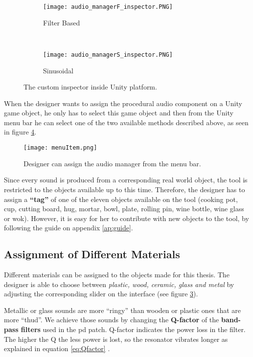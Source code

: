 \begin{figure}[H]
    \centering
    \begin{subfigure}[b]{0.4\textwidth}
        \texttt{[image: audio\_managerF\_inspector.PNG]}
        \caption{Filter Based}
        \label{fig:FB}
    \end{subfigure}
    ~ %
    \begin{subfigure}[b]{0.4\textwidth}
        \texttt{[image: audio\_managerS\_inspector.PNG]}
        \caption{Sinusoidal}
        \label{fig:sin}
    \end{subfigure}
    \caption{The custom inspector inside Unity platform.}\label{fig:custom_insp}
\end{figure}

When the designer wants to assign the procedural audio component on a Unity game object, he only has to select this game object and then from the Unity menu bar he can select one of the two available methods described above, as seen in figure \ref{fig:menu_item}.
\begin{figure}[H]
  \centering
    \texttt{[image: menuItem.png]}
      \caption{Designer can assign the audio manager from the menu bar.}
      \label{fig:menu_item}
\end{figure}

Since every sound is produced from a corresponding real world object, the tool is restricted to the objects available up to this time. Therefore, the designer has to assign a \textbf{``tag''} of one of the eleven objects available on the tool (cooking pot, cup, cutting board, hug, mortar, bowl, plate, rolling pin, wine bottle, wine glass or wok). However, it is easy for her to contribute with new objects to the tool, by following the guide on appendix \ref{ap:guide}.

\subsection{Assignment of Different Materials}
Different materials can be assigned to the objects made for this thesis. The designer is able to choose between \textit{plastic, wood, ceramic, glass and metal} by adjusting the corresponding slider on the interface (see figure \ref{fig:custom_insp}). 

Metallic or glass sounds are more ``ringy'' than wooden or plastic ones that are more ``thud''. We achieve those sounds by changing the \textbf{Q-factor} of the \textbf{band-pass filters} used in the pd patch. Q-factor indicates the power loss in the filter. The higher the Q the less power is lost, so the resonator vibrates longer as explained in equation \ref{eq:Qfactor} \cite{bib:Q}.

